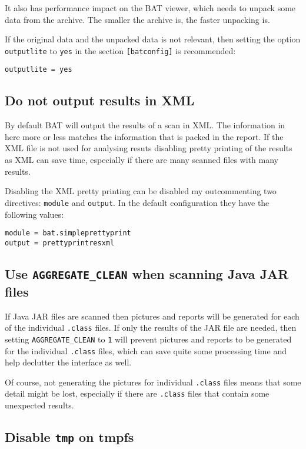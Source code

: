 \documentclass[10pt]{article}
\begin{document}
It also has performance impact on the BAT viewer, which needs to unpack some
data from the archive. The smaller the archive is, the faster unpacking is.

If the original data and the unpacked data is not relevant, then setting the
option \texttt{outputlite} to \texttt{yes} in the section \texttt{[batconfig]}
is recommended:

\begin{verbatim}
outputlite = yes
\end{verbatim}

\subsection{Do not output results in XML}

By default BAT will output the results of a scan in XML. The information in
here more or less matches the information that is packed in the report. If the
XML file is not used for analysing resuts disabling pretty printing of the
results as XML can save time, especially if there are many scanned files with
many results.

Disabling the XML pretty printing can be disabled my outcommenting two
directives: \texttt{module} and \texttt{output}. In the default configuration
they have the following values:

\begin{verbatim}
module = bat.simpleprettyprint
output = prettyprintresxml
\end{verbatim}

\subsection{Use \texttt{AGGREGATE\_CLEAN} when scanning Java JAR files}

If Java JAR files are scanned then pictures and reports will be generated for
each of the individual \texttt{.class} files. If only the results of the JAR
file are needed, then setting \texttt{AGGREGATE\_CLEAN} to \texttt{1} will
prevent pictures and reports to be generated for the individual \texttt{.class}
files, which can save quite some processing time and help declutter the
interface as well.

Of course, not generating the pictures for individual \texttt{.class} files
means that some detail might be lost, especially if there are \texttt{.class}
files that contain some unexpected results.

\subsection{Disable \texttt{tmp} on tmpfs}
\end{document}
